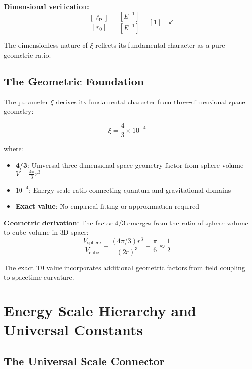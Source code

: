 \documentclass[12pt,a4paper]{report}
\newcommand{\lP}{\ell_{\text{P}}}         %
\newcommand{\rzero}{r_0}                  %
\begin{document}
\textbf{Dimensional verification:}
\begin{equation}
	[\xi] = \frac{[\lP]}{[\rzero]} = \frac{[E^{-1}]}{[E^{-1}]} = [1] \quad \checkmark
\end{equation}

The dimensionless nature of $\xi$ reflects its fundamental character as a pure geometric ratio.

\subsection{The Geometric Foundation}
\label{subsec:geometric_foundation}

The parameter $\xi$ derives its fundamental character from three-dimensional space geometry:

\begin{equation}
	\xi = \frac{4}{3} \times 10^{-4}
\end{equation}

where:
\begin{itemize}
	\item \textbf{4/3}: Universal three-dimensional space geometry factor from sphere volume $V = \frac{4\pi}{3}r^3$
	\item \textbf{$10^{-4}$}: Energy scale ratio connecting quantum and gravitational domains
	\item \textbf{Exact value}: No empirical fitting or approximation required
\end{itemize}

\textbf{Geometric derivation:}
The factor 4/3 emerges from the ratio of sphere volume to cube volume in 3D space:
\begin{equation}
	\frac{V_{\text{sphere}}}{V_{\text{cube}}} = \frac{(4\pi/3)r^3}{(2r)^3} = \frac{\pi}{6} \approx \frac{1}{2}
\end{equation}

The exact T0 value incorporates additional geometric factors from field coupling to spacetime curvature.

\section{Energy Scale Hierarchy and Universal Constants}
\label{sec:energy_scale_hierarchy}

\subsection{The Universal Scale Connector}
\label{subsec:universal_scale_connector}
\end{document}
